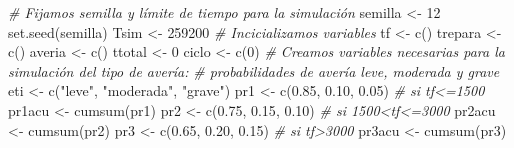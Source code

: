 \documentclass[
]{book}
\newenvironment{Shaded}{\begin{snugshade}}{\end{snugshade}}
\newcommand{\CommentTok}[1]{\textcolor[rgb]{0.56,0.35,0.01}{\textit{#1}}}
\newcommand{\DecValTok}[1]{\textcolor[rgb]{0.00,0.00,0.81}{#1}}
\newcommand{\FloatTok}[1]{\textcolor[rgb]{0.00,0.00,0.81}{#1}}
\newcommand{\FunctionTok}[1]{\textcolor[rgb]{0.00,0.00,0.00}{#1}}
\newcommand{\NormalTok}[1]{#1}
\newcommand{\OtherTok}[1]{\textcolor[rgb]{0.56,0.35,0.01}{#1}}
\newcommand{\StringTok}[1]{\textcolor[rgb]{0.31,0.60,0.02}{#1}}
\theoremstyle{definition}
\theoremstyle{definition}
\theoremstyle{definition}
\theoremstyle{definition}
\theoremstyle{remark}
\begin{document}
\begin{Shaded}
\begin{Highlighting}[]
\CommentTok{\# Fijamos semilla y límite de tiempo para la simulación}
\NormalTok{semilla }\OtherTok{\textless{}{-}} \DecValTok{12}
\FunctionTok{set.seed}\NormalTok{(semilla)}
\NormalTok{Tsim }\OtherTok{\textless{}{-}} \DecValTok{259200}
\CommentTok{\# Incicializamos variables}
\NormalTok{tf }\OtherTok{\textless{}{-}} \FunctionTok{c}\NormalTok{()}
\NormalTok{trepara }\OtherTok{\textless{}{-}} \FunctionTok{c}\NormalTok{()}
\NormalTok{averia }\OtherTok{\textless{}{-}} \FunctionTok{c}\NormalTok{()}
\NormalTok{ttotal }\OtherTok{\textless{}{-}} \DecValTok{0}
\NormalTok{ciclo }\OtherTok{\textless{}{-}} \FunctionTok{c}\NormalTok{(}\DecValTok{0}\NormalTok{)}
\CommentTok{\# Creamos variables necesarias para la simulación del tipo de avería:}
\CommentTok{\# probabilidades de avería leve, moderada y grave}
\NormalTok{eti }\OtherTok{\textless{}{-}} \FunctionTok{c}\NormalTok{(}\StringTok{"leve"}\NormalTok{, }\StringTok{"moderada"}\NormalTok{, }\StringTok{"grave"}\NormalTok{)}
\NormalTok{pr1 }\OtherTok{\textless{}{-}} \FunctionTok{c}\NormalTok{(}\FloatTok{0.85}\NormalTok{, }\FloatTok{0.10}\NormalTok{, }\FloatTok{0.05}\NormalTok{)  }\CommentTok{\# si tf\textless{}=1500}
\NormalTok{pr1acu }\OtherTok{\textless{}{-}} \FunctionTok{cumsum}\NormalTok{(pr1)}
\NormalTok{pr2 }\OtherTok{\textless{}{-}} \FunctionTok{c}\NormalTok{(}\FloatTok{0.75}\NormalTok{, }\FloatTok{0.15}\NormalTok{, }\FloatTok{0.10}\NormalTok{)  }\CommentTok{\# si 1500\textless{}tf\textless{}=3000}
\NormalTok{pr2acu }\OtherTok{\textless{}{-}} \FunctionTok{cumsum}\NormalTok{(pr2)}
\NormalTok{pr3 }\OtherTok{\textless{}{-}} \FunctionTok{c}\NormalTok{(}\FloatTok{0.65}\NormalTok{, }\FloatTok{0.20}\NormalTok{, }\FloatTok{0.15}\NormalTok{)  }\CommentTok{\# si tf\textgreater{}3000}
\NormalTok{pr3acu }\OtherTok{\textless{}{-}} \FunctionTok{cumsum}\NormalTok{(pr3)}


\end{Highlighting}
\end{Shaded}
\end{document}
